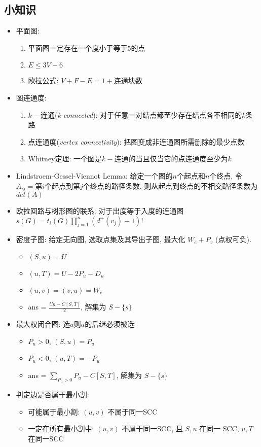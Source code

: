 \documentclass[landscape, twocolumn, 8pt, a4paper, twoside]{extarticle}
\begin{document}
  \subsection{小知识}
  \begin{itemize}
  \item 平面图: 
    \begin{enumerate}
    \item 平面图一定存在一个度小于等于$5$的点
    \item $E \le 3V - 6$
    \item 欧拉公式: $V + F - E = 1 + \mbox{连通块数}$
    \end{enumerate}
  \item 图连通度: 
    \begin{enumerate}
    \item $k-$连通(\emph{k-connected}): 对于任意一对结点都至少存在结点各不相同的$k$条路
    \item 点连通度(\emph{vertex connectivity}): 把图变成非连通图所需删除的最少点数
    \item Whitney定理: 一个图是$k-$连通的当且仅当它的点连通度至少为$k$
    \end{enumerate}
  \item Lindstroem-Gessel-Viennot Lemma:
    给定一个图的$n$个起点和$n$个终点, 
    令$A_{ij} = $第$i$个起点到第$j$个终点的路径条数,
    则从起点到终点的不相交路径条数为 $det(A)$
  \item 欧拉回路与树形图的联系: 
    对于出度等于入度的连通图
    $s(G) = t_i(G) \prod_{j = 1}^{n} (d^+(v_j) - 1)! $
  \item 密度子图: 给定无向图, 选取点集及其导出子图, 最大化 $W_e + P_v$ (点权可负).
    \begin{itemize}
    \item $(S, u) = U$
    \item $(u, T) = U - 2 P_u - D_u$
    \item $(u, v) = (v, u) = W_e$
    \item ans = $\frac{Un - C[S, T]}{2}$, 解集为 $S - \{s\}$
    \end{itemize}
  \item 最大权闭合图: 选$a$则$a$的后继必须被选
    \begin{itemize}
    \item $P_u > 0$, $(S, u) = P_u$
    \item $P_u < 0$, $(u, T) = -P_u$
    \item ans = $\sum\limits_{P_u > 0}^{} P_u - C[S, T]$, 解集为 $S - \{s\}$
    \end{itemize}
  \item 判定边是否属于最小割:
    \begin{itemize}
    \item 可能属于最小割: $(u, v)$ 不属于同一SCC
    \item 一定在所有最小割中: $(u, v)$ 不属于同一SCC, 且 $S, u$ 在同一 SCC, $u, T$ 在同一SCC
    \end{itemize}
  \end{itemize}
\end{document}
